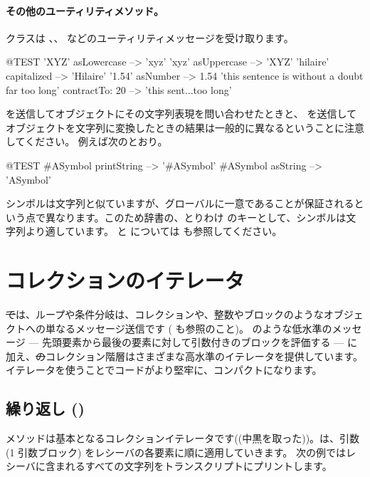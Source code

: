 \documentclass[a4paper,10pt,twoside]{book}
\begin{document}
\paragraph{その他のユーティリティメソッド。}
 クラスは 、、 などのユーティリティメッセージを受け取ります。

\begin{code}{@TEST}
'XYZ' asLowercase --> 'xyz'
'xyz' asUppercase   --> 'XYZ'
'hilaire' capitalized   --> 'Hilaire'
'1.54' asNumber      --> 1.54
'this sentence is without a doubt far too long' contractTo: 20 --> 'this sent...too long'
\end{code}

 を送信してオブジェクトにその文字列表現を問い合わせたときと、 を送信してオブジェクトを文字列に変換したときの結果は一般的に異なるということに注意してください。
例えば次のとおり。

\begin{code}{@TEST}
#ASymbol printString --> '#ASymbol'
#ASymbol asString    --> 'ASymbol'
\end{code}

シンボルは文字列と似ていますが、グローバルに一意であることが保証されるという点で異なります。このため辞書の、とりわけ  のキーとして、シンボルは文字列より適しています。
 と  については  も参照してください。

\section{コレクションのイテレータ}

\st では、ループや条件分岐は、コレクションや、整数やブロックのようなオブジェクトへの単なるメッセージ送信です ( も参照のこと)。 のような低水準のメッセージ --- 先頭要素から最後の要素に対して引数付きのブロックを評価する --- に加え、\st のコレクション階層はさまざまな高水準のイテレータを提供しています。イテレータを使うことでコードがより堅牢に、コンパクトになります。

\subsection{繰り返し ()}
 メソッドは基本となるコレクションイテレータです((中黒を取った))。は、引数 (1 引数ブロック) をレシーバの各要素に順に適用していきます。
次の例ではレシーバに含まれるすべての文字列をトランスクリプトにプリントします。
\end{document}
